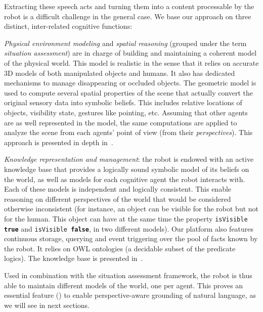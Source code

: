 Extracting these speech acts and turning them into a content processable by the
robot is a difficult challenge in the general case. We base our approach on
three distinct, inter-related cognitive functions:

\begin{inparaenum}[\itshape 1)]

\item \emph{Physical environment modeling} and \emph{spatial reasoning}
(grouped under the term \emph{situation
assessment})  are in charge of building and
maintaining a coherent model of the physical world. This model is realistic in
the sense that it relies on accurate 3D models of both manipulated objects and
humans. It also has dedicated mechanisms to manage disappearing or occluded
objects.  The geometric model is used to compute several spatial properties of
the scene that actually convert the original sensory data into symbolic
beliefs. This includes relative locations of objects, visibility state,
gestures like pointing, etc.  Assuming that other agents are as well
represented in the model, the same computations are applied to analyze the
scene from each agents' point of view (\ie from their \emph{perspectives}).
This approach is presented in depth in~\cite{Sisbot2011}.

\item \emph{Knowledge representation and management}: the robot is endowed with
an active knowledge base that provides a logically sound symbolic model of its
beliefs on the world, as well as models for each cognitive agent the robot
interacts with. Each of these models is independent and logically consistent.
This enable reasoning on different perspectives of the world that would be
considered otherwise inconsistent (for instance, an object can be visible for
the robot but not for the human. This object can have at the same time the
property {\tt isVisible \textbf{true}} and {\tt isVisible \textbf{false}}, in
two different models).  Our platform also features continuous storage, querying
and event triggering over the pool of facts known by the robot. It relies on
OWL ontologies (a decidable subset of the predicate logics). The knowledge base
is presented in~\cite{Lemaignan2010}.

Used in combination with the situation assessment framework, the robot is thus
able to maintain different models of the world, one per agent. This proves an
essential feature (\cite{Roy2005, Kruijff2010}) to enable perspective-aware
grounding of natural language, as we will see in next sections.


\end{inparaenum}
